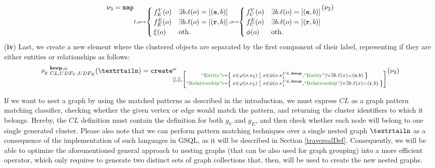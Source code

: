 \begin{definition}
	\[\nu_3=\texttt{map}_{\ell,o\mapsto\begin{cases}
		f_E^V(o) & \exists b. \ell(o)=[(\texttt{e},b)]\\
		f_E^E(o) & \exists b. \ell(o)=[(\texttt{r},b)]\\
		\xi(o) & \textup{oth.}\\
		\end{cases},o\mapsto\begin{cases}
		f_C^V(o) & \exists b. \ell(o)=[(\texttt{e},b)]\\
		f_C^E(o) & \exists b. \ell(o)=[(\texttt{r},b)]\\
		\phi(o) & \textup{oth.}\\
		\end{cases}}(\nu_2)\]
	(\textbf{iv}) Last, we create a new element where the clustered objects are separated by the first component of their label, representing if they are either entities or relationships as follows:
	\[{\nu_g\;}^{\textbf{keep},\omega}_{CL,UDF_V,UDF_E}(\nested)=\texttt{create}_{[],[],\left[\substack{\ONTA\mapsto \Set{x\in\varphi(o.\nu_2)|x\in \phi(o.\nu_1^{CL,\textbf{keep}},\ONTA)\vee\exists b. \ell(x)=(\texttt{e},b)}\\ \RELA\mapsto \Set{x\in\varphi(o.\nu_2)|x\in \phi(o.\nu_1^{CL,\textbf{keep}},\RELA)\vee\exists b. \ell(x)=(\texttt{r},b)}}\right]}^\omega(\nu_3)\]
	
\end{definition}

If we want to nest a graph by using the matched patterns as described in the introduction, we must express $CL$ as a graph pattern matching classifier, checking whether the given vertex or edge would match the pattern, and returning the cluster identifiers to which it belongs. Hereby, the $CL$ definition must contain the definition for both $g_V$ and $g_E$, and then check whether each node will belong to one single generated cluster. Please also note that we can perform  pattern matching techniques over a single nested graph $\nested$ as a consequence of the implementation of such languages in GSQL, as it will be described in Section \vref{traversalDef}. Consequently, we will be able to  optimize the aforementioned general approach to nesting graphs (that can be also used for graph grouping) into a more efficient operator, which only requires to generate two distinct sets of graph collections that, then, will be used to create the new nested graphs.

